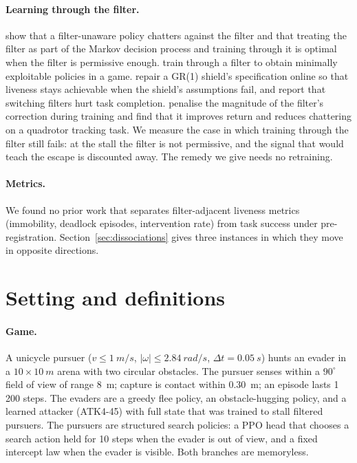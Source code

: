 \documentclass{l4dc2027}
\begin{document}
\paragraph{Learning through the filter.} \citet{oh2026provably} show that a filter-unaware policy chatters against the filter and that treating the filter as part of the Markov decision process and training through it is optimal when the filter is permissive enough. \citet{wu2026competence} train through a filter to obtain minimally exploitable policies in a game. \citet{georgescu2026gr1} repair a GR(1) shield's specification online so that liveness stays achievable when the shield's assumptions fail, and \citet{nakamura2025latent} report that switching filters hurt task completion. \citet{pizarro2025filtering} penalise the magnitude of the filter's correction during training and find that it improves return and reduces chattering on a quadrotor tracking task. We measure the case in which training through the filter still fails: at the stall the filter is not permissive, and the signal that would teach the escape is discounted away. The remedy we give needs no retraining.

\paragraph{Metrics.} We found no prior work that separates filter-adjacent liveness metrics (immobility, deadlock episodes, intervention rate) from task success under pre-registration. Section~\ref{sec:dissociations} gives three instances in which they move in opposite directions.

\section{Setting and definitions}\label{sec:setting}

\paragraph{Game.} A unicycle pursuer ($v \le \SI{1}{m/s}$, $|\omega| \le \SI{2.84}{rad/s}$, $\Delta t = \SI{0.05}{s}$) hunts an evader in a $10 \times \SI{10}{m}$ arena with two circular obstacles. The pursuer senses within a $90^\circ$ field of view of range \SI{8}{m}; capture is contact within \SI{0.30}{m}; an episode lasts 1\,200 steps. The evaders are a greedy flee policy, an obstacle-hugging policy, and a learned attacker (ATK4-45) with full state that was trained to stall filtered pursuers. The pursuers are structured search policies: a PPO head that chooses a search action held for 10 steps when the evader is out of view, and a fixed intercept law when the evader is visible. Both branches are memoryless.
\end{document}
